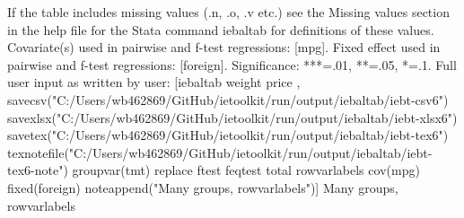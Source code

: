 If the table includes missing values (.n, .o, .v etc.) see the Missing values section in the help file for the Stata command iebaltab for definitions of these values. Covariate(s) used in pairwise and f-test regressions: [mpg]. Fixed effect used in pairwise and f-test regressions: [foreign]. Significance: ***=.01, **=.05, *=.1. Full user input as written by user: [iebaltab weight price , savecsv("C:/Users/wb462869/GitHub/ietoolkit/run/output/iebaltab/iebt-csv6") savexlsx("C:/Users/wb462869/GitHub/ietoolkit/run/output/iebaltab/iebt-xlsx6") savetex("C:/Users/wb462869/GitHub/ietoolkit/run/output/iebaltab/iebt-tex6") texnotefile("C:/Users/wb462869/GitHub/ietoolkit/run/output/iebaltab/iebt-tex6-note") groupvar(tmt) replace ftest feqtest total rowvarlabels cov(mpg) fixed(foreign) noteappend("Many groups, rowvarlabels")] Many groups, rowvarlabels
